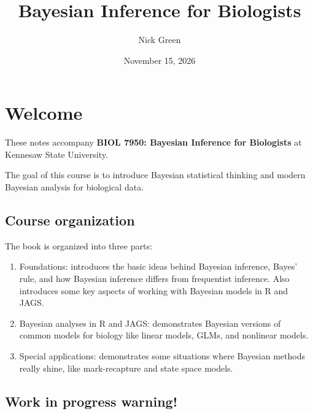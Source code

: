 \documentclass[
  13,
  letterpaper,
]{report}
\title{Bayesian Inference for Biologists}
\author{Nick Green}
\date{November 15, 2026}
\providecommand{\tightlist}{%
  \setlength{\itemsep}{0pt}\setlength{\parskip}{0pt}}
\renewcommand*\contentsname{Table of contents}
\newcommand\contentsname{Table of contents}
\begin{document}
\maketitle

\renewcommand*\contentsname{Table of contents}
{
\setcounter{tocdepth}{2}
\tableofcontents
}


\chapter*{Welcome}\label{welcome}


These notes accompany \textbf{BIOL 7950: Bayesian Inference for
Biologists} at Kennesaw State University.

The goal of this course is to introduce Bayesian statistical thinking
and modern Bayesian analysis for biological data.

\section*{Course organization}\label{course-organization}


The book is organized into three parts:

\begin{enumerate}
\def\labelenumi{\arabic{enumi}.}
\tightlist
\item
  Foundations: introduces the basic ideas behind Bayesian inference,
  Bayes' rule, and how Bayesian inference differs from frequentist
  inference. Also introduces some key aspects of working with Bayesian
  models in R and JAGS.
\item
  Bayesian analyses in R and JAGS: demonstrates Bayesian versions of
  common models for biology like linear models, GLMs, and nonlinear
  models.
\item
  Special applications: demonstrates some situations where Bayesian
  methods really shine, like mark-recapture and state space models.
\end{enumerate}

\section*{Work in progress warning!}\label{work-in-progress-warning}
\end{document}
